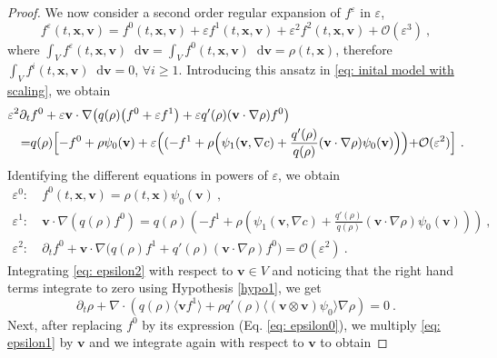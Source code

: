 \documentclass[review,onefignum,onetabnum]{siamart220329}
\newcommand {\e}  {\varepsilon}
\newcommand*\diff{\mathop{}\!\mathrm{d}}
\begin{document}
\begin{proof}
We now consider a second order regular expansion of $f^\e$ in $\varepsilon$, 
\begin{equation*}
    f^\e(t,\mathbf{x},\mathbf{v})=f^0(t,\mathbf{x},\mathbf{v})+\varepsilon f^1(t,\mathbf{x},\mathbf{v})+\varepsilon^2 f^2(t,\mathbf{x},\mathbf{v})+\mathcal{O}(\varepsilon^3)\ , 
\end{equation*}
where $\int_V f^\e(t,\mathbf{x},\mathbf{v})\diff \mathbf{v} = \int_V f^0(t,\mathbf{x},\mathbf{v})\diff \mathbf{v} = \rho(t,\mathbf{x})$, therefore $\int_V f^i(t,\mathbf{x},\mathbf{v})\diff \mathbf{v}=0$, $\forall i\geq 1$.
Introducing this ansatz in \cref{eq: inital model with scaling}, we obtain
{\begin{align*}
    \varepsilon^2\partial_t &f^0+\varepsilon\mathbf{v}\cdot\nabla\big(q(\rho)\big(f^0+\varepsilon f^1\big)  + \varepsilon q'(\rho)(\mathbf{v}\cdot\nabla\rho)f^0  \big) \\
    =&q(\rho)\Bigl[-f^0+\rho \psi_0(\mathbf{v})+\varepsilon \Bigl((-f^1 + \rho \Bigl(  \psi_1(\mathbf{v},\nabla c)+\frac{q'(\rho)}{q(\rho)}(\mathbf{v}\cdot\nabla\rho)\psi_0(\mathbf{v})\Bigr)\Bigr){+\mathcal{O}(\varepsilon^2)}
      \Bigr]\ .
\end{align*}}
\noindent Identifying the different equations in powers of $\varepsilon$, we obtain
\begin{align}
    \varepsilon^0: & \ f^0(t,\mathbf{x},\mathbf{v})=\rho(t,\mathbf{x})\psi_0(\mathbf{v})\ ,\label{eq: epsilon0}\\
    \varepsilon^1: & \ \mathbf{v}\cdot\nabla(q(\rho)f^0)=q(\rho)\left(-f^1+\rho\left(\psi_1(\mathbf{v},\nabla c)+\frac{q'(\rho)}{q(\rho)}(\mathbf{v}\cdot\nabla\rho)\psi_0(\mathbf{v})\right)\right)\ ,\label{eq: epsilon1}\\
    \varepsilon^2: & \ \partial_tf^0+\mathbf{v}\cdot\nabla \bigg(q(\rho)f^1 + q'(\rho)(\mathbf{v}\cdot\nabla\rho)f^0 \bigg)={\mathcal{O}(\varepsilon^2)} \ \label{eq: epsilon2}.\
\end{align}
Integrating \cref{eq: epsilon2} with respect to $\mathbf{v}\in V$ and noticing that the right hand terms integrate to zero using Hypothesis \cref{hypo1}, we get
\begin{equation}
    \partial_t\rho+\nabla\cdot \left(q(\rho)\langle\mathbf{v}f^1\rangle +\rho q'(\rho)\langle(\mathbf{v}\otimes \mathbf{v}) \psi_0\rangle \nabla\rho\right)=0\ .\label{eq: macroscopic equation}
\end{equation}
Next, after replacing $f^0$ by its expression (Eq. \cref{eq: epsilon0}), we multiply \cref{eq: epsilon1} by $\mathbf{v}$ and we integrate again with respect to $\mathbf{v}$ to obtain

\end{proof}
\end{document}
